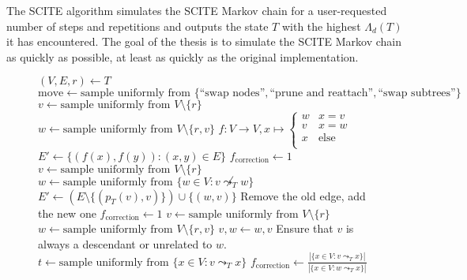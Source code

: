 The \ac{SCITE} algorithm simulates the \ac{SCITE} Markov chain for a user-requested number of steps and repetitions and outputs the state $T$ with the highest $\Lambda_d(T)$ it has encountered. The goal of the thesis is to simulate the \ac{SCITE} Markov chain as quickly as possible, at least as quickly as the original implementation.

\begin{figure}[p]
    \begin{algorithmic}[1]
            \State $(V, E, r) \leftarrow T$
            \State $\mathrm{move} \leftarrow \text{sample uniformly from } \{\text{``swap nodes''}, \text{``prune and reattach''}, \text{``swap subtrees''}\}$
                \State $v \leftarrow \text{sample uniformly from } V \setminus \{r\}$
                \State $w \leftarrow \text{sample uniformly from } V \setminus \{r, v\}$
                \State $f : V \rightarrow V, x \mapsto \begin{cases}
                    w & x = v \\
                    v & x = w \\
                    x & \text{else} \\
                \end{cases}$
                \State $E' \leftarrow \{(f(x), f(y)) : (x, y) \in E\}$
                \State $f_\mathrm{correction} \leftarrow 1$
                \State $v \leftarrow \text{sample uniformly from } V \setminus \{r\}$
                \State $w \leftarrow \text{sample uniformly from } \{w \in V : v \not\leadsto_T w\}$
                \State $E' \leftarrow \left(E \setminus \{(p_T(v), v)\}\right)  \cup \{(w, v)\}$ \Comment Remove the old edge, add the new one
                \State $f_\mathrm{correction} \leftarrow 1$
                \State $v \leftarrow \text{sample uniformly from } V \setminus \{r\}$
                \State $w \leftarrow \text{sample uniformly from } V \setminus \{r, v\}$
                    \State $v, w \leftarrow w, v$ \Comment Ensure that $v$ is always a descendant or unrelated to $w$.
                \EndIf
                    \State $t \leftarrow \text{sample uniformly from } \{x \in V: v \leadsto_T x\}$
                    \State $f_\mathrm{correction} \leftarrow \frac{|\{x \in V : v \leadsto_T x\}|}{|\{x \in V : w \leadsto_T x\}|}$

\end{algorithmic}
\end{figure}
